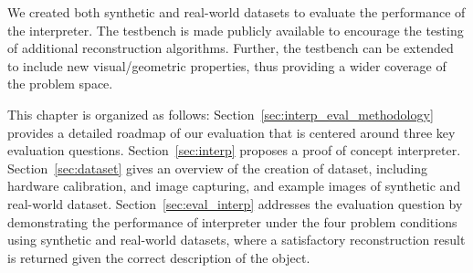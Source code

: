 We created both synthetic and real-world datasets to evaluate the performance of the interpreter. The testbench is made publicly available to encourage the testing of additional reconstruction algorithms. Further, the testbench can be extended to include new visual/geometric properties, thus providing a wider coverage of the problem space.




This chapter is organized as follows: Section~\ref{sec:interp_eval_methodology} provides a detailed roadmap of our evaluation that is centered around three key evaluation questions. Section~\ref{sec:interp} proposes a proof of concept interpreter. Section~\ref{sec:dataset} gives an overview of the creation of dataset, including hardware calibration, and image capturing, and example images of synthetic and real-world dataset. Section~\ref{sec:eval_interp} addresses the evaluation question by demonstrating the performance of interpreter under the four problem conditions using synthetic and real-world datasets, where a satisfactory reconstruction result is returned given the correct description of the object.

